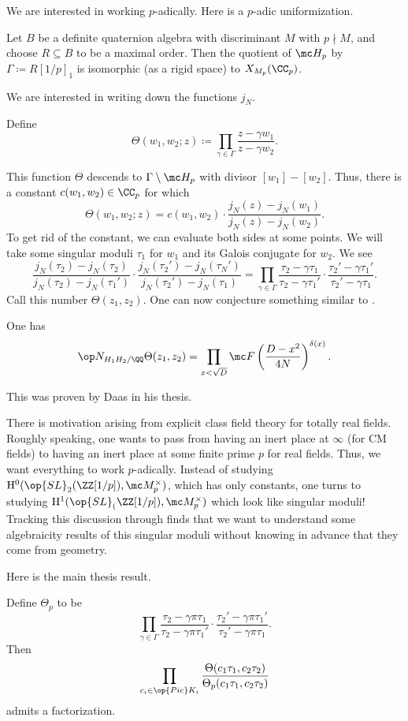 \documentclass{article}
\begin{document}
We are interested in working $p$-adically. Here is a $p$-adic uniformization.
\begin{theorem}
	Let $B$ be a definite quaternion algebra with discriminant $M$ with $p\nmid M$, and choose $R\subseteq B$ to be a maximal order. Then the quotient of $\mc H_p$ by $\Gamma\coloneqq R[1/p]_1$ is isomorphic (as a rigid space) to $X_{M_p}(\CC_p)$.
\end{theorem}
We are interested in writing down the functions $j_N$.
\begin{notation}
	Define
	\[\Theta(w_1,w_2;z)\coloneqq\prod_{\gamma\in\Gamma}\frac{z-\gamma w_1}{z-\gamma w_2}.\]
\end{notation}
This function $\Theta$ descends to $\Gamma\setminus\mc H_p$ with divisor $[w_1]-[w_2]$. Thus, there is a constant $c(w_1,w_2)\in\CC_p$ for which
\[\Theta(w_1,w_2;z)=c(w_1,w_2)\cdot\frac{j_N(z)-j_N(w_1)}{j_N(z)-j_N(w_2)}.\]
To get rid of the constant, we can evaluate both sides at some points. We will take some singular moduli $\tau_1$ for $w_1$ and its Galois conjugate for $w_2$. We see
\[\frac{j_N(\tau_2)-j_N(\tau_2)}{j_N(\tau_2)-j_N(\tau_1')}\cdot\frac{j_N(\tau_2')-j_N(\tau_N')}{j_N(\tau_2')-j_N(\tau_1)}=\prod_{\gamma\in\Gamma}\frac{\tau_2-\gamma\tau_1}{\tau_2-\gamma\tau_1'}\cdot\frac{\tau_2'-\gamma\tau_1'}{\tau_2'-\gamma\tau_1}.\]
Call this number $\Theta(z_1,z_2)$. One can now conjecture something similar to .
\begin{conj}
	One has
	\[\op N_{H_1H_2/\QQ}\Theta(z_1,z_2)=\prod_{x<\sqrt D}\mc F\left(\frac{D-x^2}{4N}\right)^{\delta(x)}.\]
\end{conj}
This was proven by Daas in his thesis.
\begin{remark}
	There is motivation arising from explicit class field theory for totally real fields. Roughly speaking, one wants to pass from having an inert place at $\infty$ (for CM fields) to having an inert place at some finite prime $p$ for real fields. Thus, we want everything to work $p$-adically. Instead of studying $\mathrm H^0(\op{SL}_2(\ZZ[1/p]),\mc M_p^\times)$, which has only constants, one turns to studying $\mathrm H^1(\op{SL}_(\ZZ[1/p]),\mc M_p^\times)$ which look like singular moduli! Tracking this discussion through finds that we want to understand some algebraicity results of this singular moduli without knowing in advance that they come from geometry.
\end{remark}
Here is the main thesis result.
\begin{theorem}[Daas]
	Define $\Theta_p$ to be
	\[\prod_{\gamma\in\Gamma}\frac{\tau_2-\gamma\pi\tau_1}{\tau_2-\gamma\pi\tau_1'}\cdot\frac{\tau_2'-\gamma\pi\tau_1'}{\tau_2'-\gamma\pi\tau_1}.\]
	Then
	\[\prod_{c_i\in\op{Pic}K_i}\frac{\Theta(c_1\tau_1,c_2\tau_2)}{\Theta_p(c_1\tau_1,c_2\tau_2)}\]
	admits a factorization.
\end{theorem}
\end{document}
